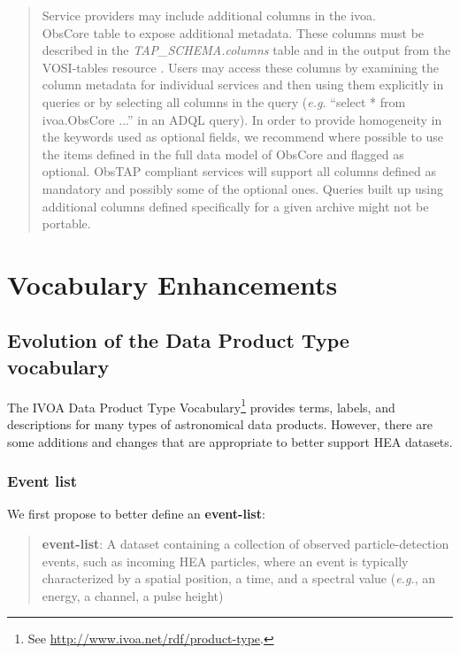 \documentclass[11pt,a4paper]{ivoa}
\begin{document}
\begin{quote}
Service providers may include additional columns in the ivoa.\\ObsCore table to expose additional metadata. These columns must be described in the {\it TAP\_SCHEMA.columns} table and in the output from the VOSI-tables resource \citep{2017ivoa.spec.0524G}. Users may access these columns by examining the column metadata for individual services and then using them explicitly in queries or by selecting all columns in the query ({\em e.g.\/} ``select * from ivoa.ObsCore ...'' in an ADQL query). In order to provide homogeneity in the keywords used as optional fields, we recommend where possible to use the items defined in the full data model of ObsCore and flagged as optional. ObsTAP compliant services will support all columns defined as mandatory and possibly some of the optional ones. Queries built up using additional columns defined specifically for a given archive might not be portable.
\end{quote}

\section{Vocabulary Enhancements}
\label{sec:voc}

\subsection{Evolution of the Data Product Type vocabulary}
\label{sec:voc_product_type}

The \gls{IVOA} Data Product Type Vocabulary\footnote{See \url{http://www.ivoa.net/rdf/product-type}.} provides terms, labels, and descriptions for many types of astronomical data products. However, there are some additions and changes that are appropriate to better support \gls{HEA} datasets.


\subsubsection{Event list}

We first propose to better define an {\bf event-list}:

\begin{quote}
{\bf event-list}: A dataset containing a collection of observed particle-detection events, such as incoming \gls{HEA} particles, where an event is typically characterized by a spatial position, a time, and a spectral value ({\em e.g.\/}, an energy, a channel, a pulse height)
\end{quote}
\end{document}
